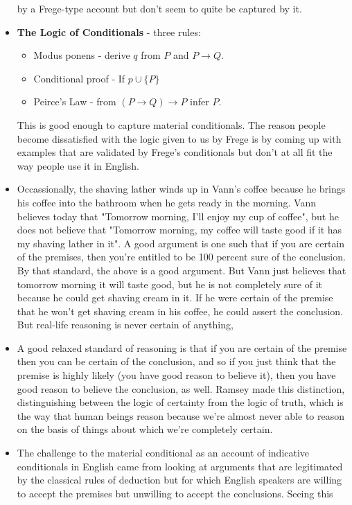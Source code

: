 \documentclass[12pt]{article}
\theoremstyle{definition}
\begin{document}
\begin{itemize}
by a Frege-type account but don't seem to quite be captured by it.
\item \textbf{The Logic of Conditionals} - three rules:
\begin{itemize}
    \item Modus ponens - derive $q$ from $P$ and $P \rightarrow Q$.
    \item Conditional proof - If $p \cup \{ P \}$
    \item Peirce's Law - from $(P \rightarrow Q) \rightarrow P$ infer $P$.
\end{itemize}
This is good enough to capture material conditionals. The reason people become
dissatisfied with the logic given to us by Frege is by coming up with examples
that are validated by Frege's conditionals but don't at all fit the way people
use it in English. 
\item Occassionally, the shaving lather winds up in Vann's coffee because he
brings his coffee into the bathroom when he gets ready in the morning. Vann
believes today that "Tomorrow morning, I'll enjoy my cup of coffee", but he
does not believe that "Tomorrow morning, my coffee will taste good if it has my
shaving lather in it". A good argument is one such that if you are certain of
the premises, then you're entitled to be 100 percent sure of the conclusion. By
that standard, the above is a good argument. But Vann just believes that
tomorrow morning it will taste good, but he is not completely sure of it
because he could get shaving cream in it. If he were certain of the premise
that he won't get shaving cream in his coffee, he could assert the conclusion.
But real-life reasoning is never certain of anything, 
\item A good relaxed standard of reasoning is that if you are certain of the
premise then you can be certain of the conclusion, and so if you just think
that the premise is highly likely (you have good reason to believe it), then
you have good reason to believe the conclusion, as well. Ramsey made this
distinction, distinguishing between the logic of certainty from the logic of
truth, which is the way that human beings reason because we're almost never
able to reason on the basis of things about which we're completely certain.
\item The challenge to the material conditional as an account of indicative
conditionals in English came from looking at arguments that are legitimated by
the classical rules of deduction but for which English speakers are willing to
accept the premises but unwilling to accept the conclusions. Seeing this

\end{itemize}
\end{document}
